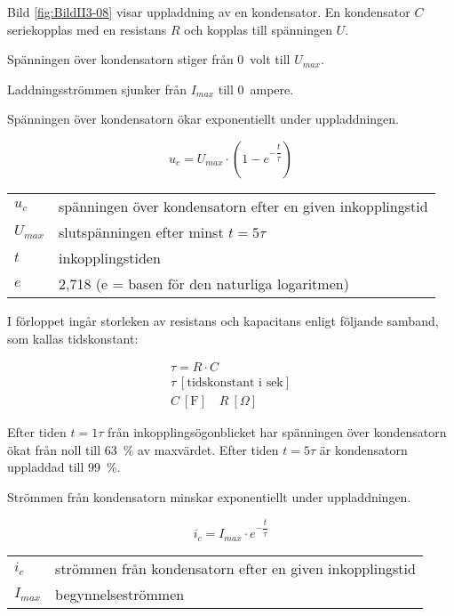 
Bild \ref{fig:BildII3-08} visar uppladdning av en kondensator.
En kondensator \(C\) seriekopplas med en resistans \(R\)
och kopplas till spänningen \(U\).


Spänningen över kondensatorn stiger från 0~volt till \(U_{max}\).

Laddningsströmmen sjunker från \(I_{max}\) till 0~ampere.

Spänningen över kondensatorn ökar exponentiellt under uppladdningen.

\[u_c = U_{max} \cdot ( 1 - e^{-\dfrac{t}{\tau}} )\]

\begin{tabular}{lp{}}
  \(u_c\)     & spänningen över kondensatorn efter en given inkopplingstid \\
  \(U_{max}\) & slutspänningen efter minst \(t = 5\tau\) \\
  \(t\)       & inkopplingstiden \\
  \(e\)       & 2,718 (e = basen för den naturliga logaritmen) \\
\end{tabular}

I förloppet ingår storleken av resistans och kapacitans enligt följande samband,
som kallas tidskonstant:

\begin{gather*}
  \tau = R \cdot C \\
  \tau\ [\text{tidskonstant i sek}] \\
  C\ [\text{F}] \quad R\ [\Omega]
\end{gather*}

Efter tiden \(t = 1\tau\) från inkopplingsögonblicket har spänningen över
kondensatorn ökat från noll till 63~\% av maxvärdet.
Efter tiden \(t = 5\tau\) är kondensatorn uppladdad till 99~\%.

Strömmen från kondensatorn minskar exponentiellt under uppladdningen.

\[i_c = I_{max} \cdot e^{-\dfrac{t}{\tau}}\]

\begin{tabular}{lp{}}
  \(i_c\) & strömmen från kondensatorn efter en given inkopplingstid \\
  \(I_{max}\) & begynnelseströmmen \\
\end{tabular}

